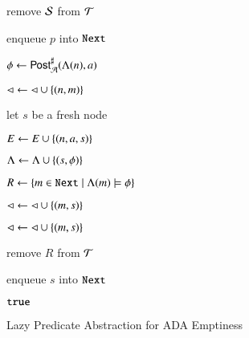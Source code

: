 \documentclass[10pt,conference,letterpaper,twocolumn]{IEEEtran}
\begin{document}
\begin{algorithm}[t!]
{\begin{algorithmic}[1]
  \State remove $\mathcal{S}$ from $\mathcal{T}$

  \State enqueue $p$ into $\mathtt{Next}$
  \label{ln:refine}

  \EndFor

  \EndIf

  \Else \label{ln:else}

  \label{ln:forall-events}

  \State $\phi \leftarrow {\mathsf{Post}}^\sharp_{\mathcal{A}}(\Lambda(n),a)$

   \label{ln:covered}

  \State $\lhd \leftarrow \lhd \cup \left\{ (n,m) \right\}$ 
  \label{ln:direct-cover}

  \Else 

  \State let $s$ be a fresh node

  \State $E \leftarrow E \cup \left\{ (n,a,s) \right\}$

  \State $\Lambda \leftarrow \Lambda \cup \left\{ (s,\phi) \right\}$

  \State $R \leftarrow \left\{ m \in \mathtt{Next} \mid \Lambda(m) \models
    \phi \right\}$ 

  

  \State $\lhd \leftarrow \lhd \cup \left\{ (m,s) \right\}$ 
  \label{ln:child-cover}

  \EndFor


  \State $\lhd \leftarrow \lhd \cup \left\{ (m,s) \right\}$ 
  \label{ln:indirect-cover}

  \EndFor

  \EndFor

  \State remove $R$ from $\mathcal{T}$

  \State enqueue $s$ into $\mathtt{Next}$ 
  \label{ln:expand}

  \EndIf

  \EndFor

  \EndIf

  \EndWhile

   $\mathtt{true}$
  \label{ln:true}
\end{algorithmic}}
\caption{Lazy Predicate Abstraction for ADA Emptiness}
\label{alg:predabs}
\end{algorithm}
\end{document}
